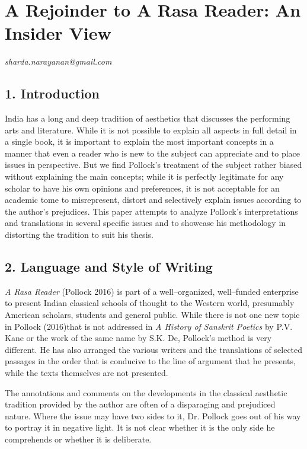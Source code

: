 
\chapter{A Rejoinder to A Rasa Reader: An Insider View}\label{chapter9}


\begin{flushright}
\textit{sharda.narayanan@gmail.com}
\end{flushright}


\section*{1. Introduction}

India has a long and deep tradition of aesthetics that discusses the performing arts and literature. While it is not possible to explain all aspects in full detail in a single book, it is important to explain the most important concepts in a manner that even a reader who is new to the subject can appreciate and to place issues in perspective. But we find Pollock’s treatment of the subject rather biased without explaining the main concepts; while it is perfectly legitimate for any scholar to have his own opinions and preferences, it is not acceptable for an academic tome to misrepresent, distort and selectively explain issues according to the author’s prejudices. This paper attempts to analyze Pollock’s interpretations and translations in several specific issues and to showcase his methodology in distorting the tradition to suit his thesis.


\section*{2. Language and Style of Writing}

\textit{A Rasa Reader} (Pollock 2016) is part of a well–organized, well–funded enterprise to present Indian classical schools of thought to the Western world, presumably American scholars, students and general public. While there is not one new topic in Pollock (2016)that is not addressed in \textit{A History of Sanskrit Poetics} by P.V. Kane or the work of the same name by S.K. De, Pollock’s method is very different. He has also arranged the various writers and the translations of selected passages in the order that is conducive to the line of argument that he presents, while the texts themselves are not presented.

The annotations and comments on the developments in the classical aesthetic tradition provided by the author are often of a disparaging and prejudiced nature. Where the issue may have two sides to it, Dr. Pollock goes out of his way to portray it in negative light. It is not clear whether it is the only side he comprehends or whether it is deliberate.


